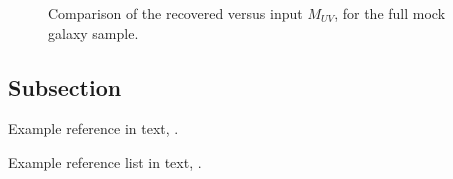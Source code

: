\begin{figure}
\caption{Comparison of the recovered versus input $M_{UV}$, for the full mock galaxy sample.}
\label{fig:muvcomparison}
\end{figure}


\subsection[Subsec]{Subsection}
\label{sec:subsec1_label}

Example reference in text, \cite{ref1}.

Example reference list in text, \cite{ref1,ref2}.




